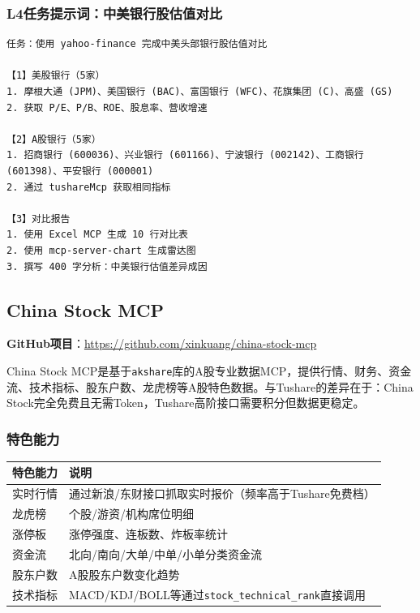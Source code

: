\subsubsection{L4任务提示词：中美银行股估值对比}

\begin{lstlisting}
任务：使用 yahoo-finance 完成中美头部银行股估值对比

【1】美股银行（5家）
1. 摩根大通 (JPM)、美国银行 (BAC)、富国银行 (WFC)、花旗集团 (C)、高盛 (GS)
2. 获取 P/E、P/B、ROE、股息率、营收增速

【2】A股银行（5家）
1. 招商银行 (600036)、兴业银行 (601166)、宁波银行 (002142)、工商银行 (601398)、平安银行 (000001)
2. 通过 tushareMcp 获取相同指标

【3】对比报告
1. 使用 Excel MCP 生成 10 行对比表
2. 使用 mcp-server-chart 生成雷达图
3. 撰写 400 字分析：中美银行估值差异成因
\end{lstlisting}

\subsection{China Stock MCP}

\textbf{GitHub项目}：\url{https://github.com/xinkuang/china-stock-mcp}

China Stock MCP是基于\texttt{akshare}库的A股专业数据MCP，提供行情、财务、资金流、技术指标、股东户数、龙虎榜等A股特色数据。与Tushare的差异在于：China Stock完全免费且无需Token，Tushare高阶接口需要积分但数据更稳定。

\subsubsection{特色能力}

\begin{table}[H]
\centering
\small
\begin{tabular}{ll}
\toprule
\textbf{特色能力} & \textbf{说明} \\
\midrule
实时行情 & 通过新浪/东财接口抓取实时报价（频率高于Tushare免费档） \\
龙虎榜 & 个股/游资/机构席位明细 \\
涨停板 & 涨停强度、连板数、炸板率统计 \\
资金流 & 北向/南向/大单/中单/小单分类资金流 \\
股东户数 & A股股东户数变化趋势 \\
技术指标 & MACD/KDJ/BOLL等通过\texttt{stock\_technical\_rank}直接调用 \\
\bottomrule
\end{tabular}
\end{table}

